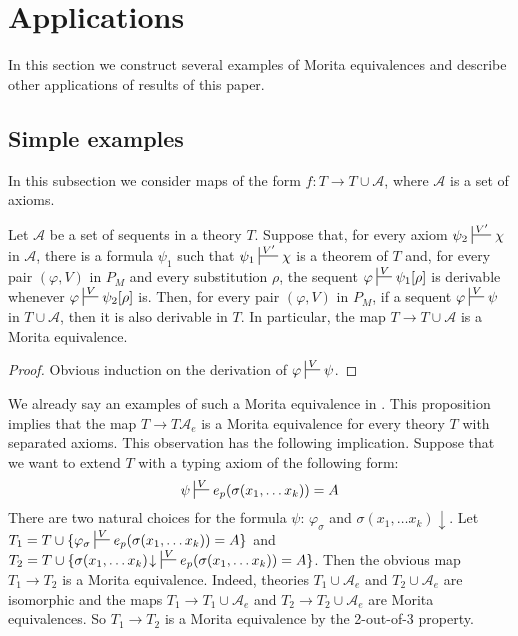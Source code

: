 \documentclass[reqno]{amsart}
\theoremstyle{definition}
\theoremstyle{remark}
\numberwithin{figure}{section}
\begin{document}
\section{Applications}
\label{sec:applications}

In this section we construct several examples of Morita equivalences and describe other applications of results of this paper.

\subsection{Simple examples}

In this subsection we consider maps of the form $f : T \to T \cup \mathcal{A}$, where $\mathcal{A}$ is a set of axioms.

\begin{prop}
Let $\mathcal{A}$ be a set of sequents in a theory $T$.
Suppose that, for every axiom $\psi_2 \sststile{}{V'} \chi$ in $\mathcal{A}$, there is a formula $\psi_1$ such that $\psi_1 \sststile{}{V'} \chi$ is a theorem of $T$
and, for every pair $(\varphi,V)$ in $P_M$ and every substitution $\rho$, the sequent $\varphi \sststile{}{V} \psi_1[\rho]$ is derivable whenever $\varphi \sststile{}{V} \psi_2[\rho]$ is.
Then, for every pair $(\varphi,V)$ in $P_M$, if a sequent $\varphi \sststile{}{V} \psi$ in $T \cup \mathcal{A}$, then it is also derivable in $T$.
In particular, the map $T \to T \cup \mathcal{A}$ is a Morita equivalence.
\end{prop}
\begin{proof}
Obvious induction on the derivation of $\varphi \sststile{}{V} \psi$.
\end{proof}

We already say an examples of such a Morita equivalence in .
This proposition implies that the map $T \to T \mathcal{A}_e$ is a Morita equivalence for every theory $T$ with separated axioms.
This observation has the following implication.
Suppose that we want to extend $T$ with a typing axiom of the following form:
\[ \psi \sststile{}{V} e_p(\sigma(x_1, \ldots x_k)) = A \]
There are two natural choices for the formula $\psi$: $\varphi_\sigma$ and $\sigma(x_1, \ldots x_k)\!\downarrow$.
Let $T_1 = T \cup \{ \varphi_\sigma \sststile{}{V} e_p(\sigma(x_1, \ldots x_k)) = A \}$ and $T_2 = T \cup \{ \sigma(x_1, \ldots x_k)\!\downarrow\ \sststile{}{V} e_p(\sigma(x_1, \ldots x_k)) = A \}$.
Then the obvious map $T_1 \to T_2$ is a Morita equivalence.
Indeed, theories $T_1 \cup \mathcal{A}_e$ and $T_2 \cup \mathcal{A}_e$ are isomorphic and the maps $T_1 \to T_1 \cup \mathcal{A}_e$ and $T_2 \to T_2 \cup \mathcal{A}_e$ are Morita equivalences.
So $T_1 \to T_2$ is a Morita equivalence by the 2-out-of-3 property.
\end{document}
